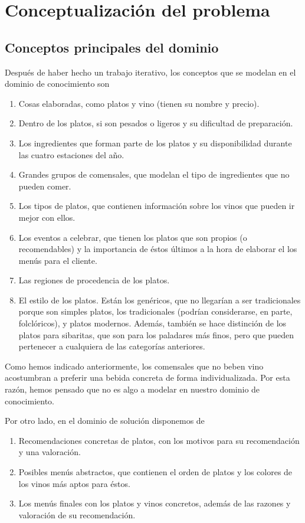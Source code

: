 % 

\section{Conceptualización del problema}
\subsection{Conceptos principales del dominio}

Después de haber hecho un trabajo iterativo, los conceptos que se modelan en el
dominio de conocimiento son
\begin{enumerate}
  \item Cosas elaboradas, como platos y vino (tienen su nombre y precio).
  \item Dentro de los platos, si son pesados o ligeros y su dificultad de
    preparación.
  \item Los ingredientes que forman parte de los platos y su disponibilidad
    durante las cuatro estaciones del año.
  \item Grandes grupos de comensales, que modelan el tipo de ingredientes que
    no pueden comer.
  \item Los tipos de platos, que contienen información sobre los vinos que
    pueden ir mejor con ellos.
  \item Los eventos a celebrar, que tienen los platos que son propios (o
    recomendables) y la importancia de éstos últimos a la hora de elaborar el
    los menús para el cliente.
  \item Las regiones de procedencia de los platos.
  \item El estilo de los platos. Están los genéricos, que no llegarían a ser
    tradicionales porque son simples platos, los tradicionales (podrían
    considerarse, en parte, folclóricos), y platos modernos. Además, también se
    hace distinción de los platos para sibaritas, que son para los paladares
    más finos, pero que pueden pertenecer a cualquiera de las categorías
    anteriores.
\end{enumerate}

Como hemos indicado anteriormente, los comensales que no beben vino acostumbran
a preferir una bebida concreta de forma individualizada. Por esta razón, hemos
pensado que no es algo a modelar en nuestro dominio de conocimiento.

Por otro lado, en el dominio de solución disponemos de
\begin{enumerate}
  \item Recomendaciones concretas de platos, con los motivos para su
    recomendación y una valoración.
  \item Posibles menús abstractos, que contienen el orden de platos y los
    colores de los vinos más aptos para éstos.
  \item Los menús finales con los platos y vinos concretos, además de las
    razones y valoración de su recomendación.
\end{enumerate}
